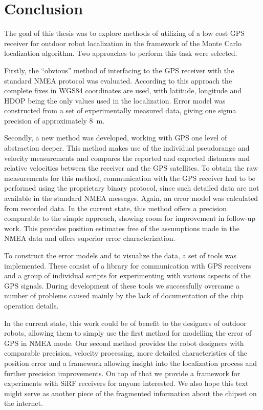 \chapter{Conclusion}
\label{chap:conclusion}

The goal of this thesis was to explore methods of utilizing of a low cost GPS receiver
for outdoor robot localization in the framework of the Monte Carlo localization algorithm.
Two approaches to perform this task were selected.

Firstly, the \enquote{obvious} method of interfacing to the GPS receiver with the
standard NMEA protocol was evaluated.
According to this approach the complete fixes in WGS84 coordinates are used,
with latitude, longitude and HDOP being the only values used in the localization.
Error model was constructed from a set of experimentally measured data,
giving one sigma precision of approximately \SI{8}{\meter}.

Secondly, a new method was developed, working with GPS one level of abstraction deeper.
This method makes use of the individual pseudorange and velocity measurements
and compares the reported and expected distances and relative velocities between
the receiver and the GPS satellites.
To obtain the raw measurements for this method, communication with the GPS
receiver had to be performed using the proprietary binary protocol,
since such detailed data are not available in the standard NMEA messages.
Again, an error model was calculated from recorded data.
In the current state, this method offers a precision comparable to the simple
approach, showing room for improvement in follow-up work.
This provides position estimates free of the assumptions made in the NMEA data
and offers superior error characterization.

To construct the error models and to visualize the data, a set of tools was implemented.
These consist of a library for communication with \sirf GPS receivers
and a group of individual scripts for experimenting with various aspects of the GPS signals.
During development of these tools we successfully overcame a number of problems caused mainly
by the lack of documentation of the \sirf chip operation details.

In the current state, this work could be of benefit to the designers of
outdoor robots, allowing them to simply use the first method for modelling the
error of GPS in NMEA mode.
Our second method provides the robot designers with comparable precision,
velocity processing, more detailed characteristics of the position error
and a framework allowing insight into the localization process and further
precision improvements.
On top of that we provide a framework for experiments with SiRF receivers
for anyone interested.
We also hope this text might serve as another piece of the fragmented
information about the \sirf chipset on the internet.
